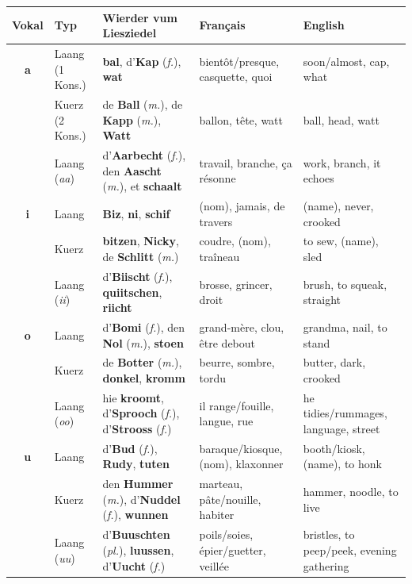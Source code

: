 \begin{table}[htbp]
    \centering
    \small
    \begin{tabular}{cl p{3.8cm} p{3.8cm} p{3.8cm}}
        \toprule
        \textbf{Vokal} & \textbf{Typ} & \textbf{Wierder vum Liesziedel} & \textbf{Français} & \textbf{English} \\
        \midrule
        \textbf{a} & Laang (1 Kons.) & \textbf{bal}, d'\textbf{Kap} (\textit{f.}), \textbf{wat} & bientôt/presque, casquette, quoi & soon/almost, cap, what \\
        & Kuerz (2 Kons.) & de \textbf{Ball} (\textit{m.}), de \textbf{Kapp} (\textit{m.}), \textbf{Watt} & ballon, tête, watt & ball, head, watt \\
        & Laang (\textit{aa}) & d'\textbf{Aarbecht} (\textit{f.}), den \textbf{Aascht} (\textit{m.}), et \textbf{schaalt} & travail, branche, ça résonne & work, branch, it echoes \\
        \midrule
        \textbf{i} & Laang & \textbf{Biz}, \textbf{ni}, \textbf{schif} & (nom), jamais, de travers & (name), never, crooked \\
        & Kuerz & \textbf{bitzen}, \textbf{Nicky}, de \textbf{Schlitt} (\textit{m.}) & coudre, (nom), traîneau & to sew, (name), sled \\
        & Laang (\textit{ii}) & d'\textbf{Biischt} (\textit{f.}), \textbf{quiitschen}, \textbf{riicht} & brosse, grincer, droit & brush, to squeak, straight \\
        \midrule
        \textbf{o} & Laang & d'\textbf{Bomi} (\textit{f.}), den \textbf{Nol} (\textit{m.}), \textbf{stoen} & grand-mère, clou, être debout & grandma, nail, to stand \\
        & Kuerz & de \textbf{Botter} (\textit{m.}), \textbf{donkel}, \textbf{kromm} & beurre, sombre, tordu & butter, dark, crooked \\
        & Laang (\textit{oo}) & hie \textbf{kroomt}, d'\textbf{Sprooch} (\textit{f.}), d'\textbf{Strooss} (\textit{f.}) & il range/fouille, langue, rue & he tidies/rummages, language, street \\
        \midrule
        \textbf{u} & Laang & d'\textbf{Bud} (\textit{f.}), \textbf{Rudy}, \textbf{tuten} & baraque/kiosque, (nom), klaxonner & booth/kiosk, (name), to honk \\
        & Kuerz & den \textbf{Hummer} (\textit{m.}), d'\textbf{Nuddel} (\textit{f.}), \textbf{wunnen} & marteau, pâte/nouille, habiter & hammer, noodle, to live \\
        & Laang (\textit{uu}) & d'\textbf{Buuschten} (\textit{pl.}), \textbf{luussen}, d'\textbf{Uucht} (\textit{f.}) & poils/soies, épier/guetter, veillée & bristles, to peep/peek, evening gathering \\

\end{tabular}
\end{table}
